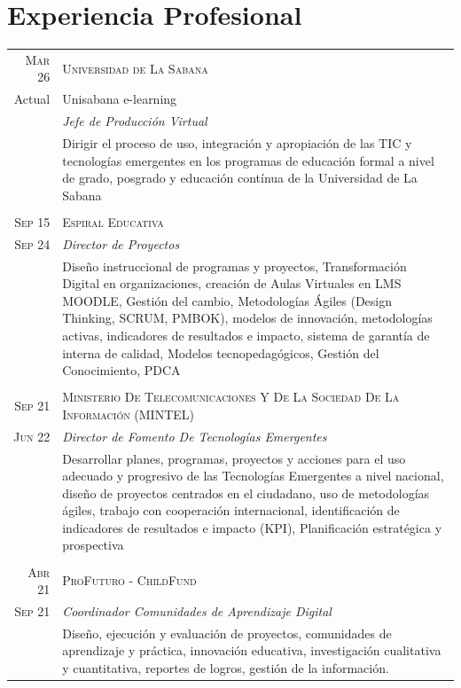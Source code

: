 \documentclass[a4paper]{article}
\begin{document}
\section{Experiencia Profesional}
\begin{longtable}{r|p{12cm}}

\textsc{Mar 26} & \textsc{Universidad de La Sabana} \\
Actual & Unisabana e-learning\\
&\emph{Jefe de Producción Virtual}\\
&\footnotesize{Dirigir el proceso de uso, integración y apropiación de las TIC y tecnologías emergentes en los programas de educación formal a nivel de grado, posgrado y educación contínua de la Universidad de La Sabana}\\

\multicolumn{2}{c}{} \\
\textsc{Sep 15} &  \textsc{Espiral Educativa} \\
\textsc{Sep} 24&\emph{Director de Proyectos}\\&\footnotesize{Diseño instruccional de programas y proyectos, Transformación Digital en organizaciones, creación de Aulas Virtuales en LMS MOODLE, Gestión del cambio, Metodologías Ágiles (Design Thinking, SCRUM, PMBOK),  modelos de innovación, metodologías activas, indicadores de resultados e impacto, sistema de garantía de interna de calidad, Modelos tecnopedagógicos, Gestión del Conocimiento, PDCA}\\


\multicolumn{2}{c}{} \\
\textsc{Sep 21} & \textsc{Ministerio De Telecomunicaciones Y De La Sociedad De La Información (MINTEL)} \\
\textsc{Jun} 22&\emph{Director de Fomento De Tecnologías Emergentes}\\&\footnotesize{Desarrollar planes, programas, proyectos y acciones para el uso adecuado y progresivo de las Tecnologías Emergentes a nivel nacional, diseño de proyectos centrados en el ciudadano, uso de metodologías ágiles, trabajo con cooperación internacional, identificación de indicadores de resultados e impacto (KPI), Planificación estratégica y prospectiva}\\



\multicolumn{2}{c}{} \\
\textsc{Abr 21} &  \textsc{ProFuturo - ChildFund}\\
\textsc{Sep 21}&\emph{Coordinador Comunidades de Aprendizaje Digital}\\&\footnotesize{Diseño, ejecución y evaluación de proyectos, comunidades de aprendizaje y práctica, innovación educativa, investigación cualitativa y cuantitativa, reportes de logros, gestión de la información.} \\




\end{longtable}
\end{document}

